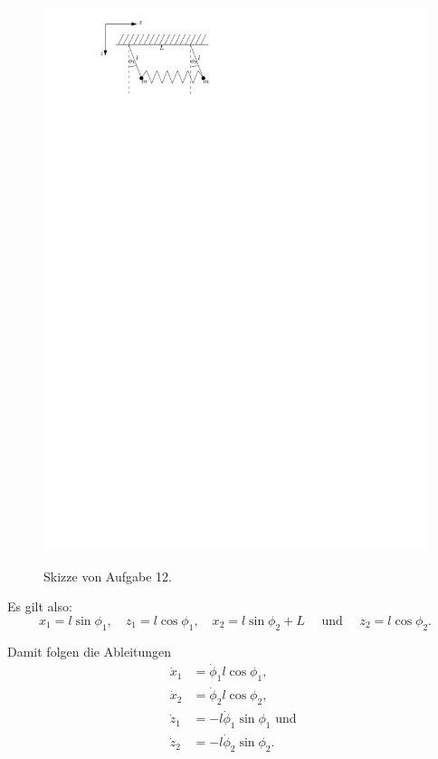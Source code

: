 \begin{figure}
	\centering
	\includegraphics{figures/ueb5/aufgabe12}
	\label{fig:ueb5_aufgabe12}
	\caption{Skizze von Aufgabe 12.}
\end{figure}

Es gilt also:
\[
	x_1 = l \sin \phi_1,
	\quad 
	z_1 = l \cos \phi_1,
	\quad 
	x_2 = l \sin \phi_2 + L
	\quad \text{ und } \quad 
	z_2 = l \cos \phi_2
	\text{.}
\]

Damit folgen die Ableitungen
\begin{align*}
	\dot{x}_1 &= \dot{\phi}_1 l \cos \phi_1, \\
	\dot{x}_2 &= \dot{\phi}_2 l \cos \phi_2, \\
	\dot{z}_1 &= - l \dot{\phi}_1 \sin \phi_1 \text{ und } \\
	\dot{z}_2 &= - l \dot{\phi}_2 \sin \phi_2
	\text{.}
\end{align*}

